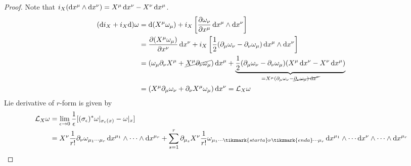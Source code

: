 \documentclass[a4paper, 10pt]{article}
\begin{document}
\begin{proof}
     Note that $i_{X}(\mathrm{d}{x}^{\mu}\wedge\mathrm{d}{x}^{\nu}) = X^{\mu}\,\mathrm{d}{x}^{\nu} - X^{\nu}\,\mathrm{d}{x}^{\mu}$.
    \begin{align*}
        (\mathrm{d} i_{X} + i_{X}\mathrm{d})\omega &= \mathrm{d}(X^{\mu}\omega_{\mu}) + i_{X}\left[\frac{\partial\omega_{\nu}}{\partial{x}^{\mu}}\,\mathrm{d}{x}^{\mu}\wedge\mathrm{d}{x}^{\nu}\right] \\
        &= \frac{\partial(X^{\mu}\omega_{\mu})}{\partial{x}^{\nu}}\,\mathrm{d}{x}^{\nu} + i_{X}\left[\frac{1}{2}(\partial_{\mu}\omega_{\nu} - \partial_{\nu}\omega_{\mu})\,\mathrm{d}{x}^{\mu}\wedge\mathrm{d}{x}^{\nu}\right] \\
        &= (\omega_{\mu}\partial_{\nu}X^{\mu} + \cancel{X^{\mu}\partial_{\nu}\omega_{\mu}})\,\mathrm{d}{x}^{\mu} + \underbrace{\frac{1}{2}(\partial_{\mu}\omega_{\nu}-\partial_{\nu}\omega_{\mu})(X^{\mu}\,\mathrm{d}{x}^{\nu}-X^{\nu}\,\mathrm{d}{x}^{\mu})}_{=X^{\mu}(\partial_{\mu}\omega_{\nu} - \cancel{\partial_{\nu}\omega_{\mu})\,\mathrm{d}{x}^{\nu}}} \\
        &= (X^{\mu}\partial_{\mu}\omega_{\nu} + \partial_{\nu}X^{\mu}\omega_{\mu})\,\mathrm{d}{x}^{\nu} = \mathcal{L}_{X}\omega
    \end{align*}
     Lie derivative of $r$-form is given by
    \begin{align*}
        \mca{L}_{X}\omega &= \lim_{\epsilon\rightarrow 0}\frac{1}{\eps}[(\sigma_{\eps})^{\ast}\omega|_{\sigma_{\eps}(x)} - \omega|_{x}] \\
        &= X^{\nu}\frac{1}{r!}\partial_{\nu}\omega_{\mu_{1}\cdots\mu_{r}}\,\d{x}^{\mu_{1}}\wedge\cdots\wedge\d{x}^{\mu_{r}} + \sum_{s=1}^{r}\partial_{\mu_{s}}X^{\nu}\frac{1}{r!}\omega_{\mu_{1}\cdots{\tikzmark{starta}\nu\tikzmark{enda}}\cdots\mu_{r}} \, \d{x}^{\mu_{1}}\wedge\cdots\d{x}^{\nu}\wedge\cdots\wedge\d{x}^{\mu_{r}}
    \end{align*}



\end{proof}
\end{document}
